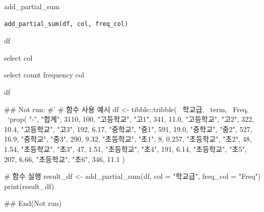 \documentclass[a4paper]{book}
\begin{document}
%
\begin{Description}
add\_partial\_sum
\end{Description}
%
\begin{Usage}
\begin{verbatim}
add_partial_sum(df, col, freq_col)
\end{verbatim}
\end{Usage}
%
\begin{Arguments}
\begin{ldescription}
\item[\code{df}] df

\item[\code{col}] select col

\item[\code{freq\_col}] select count frequency col
\end{ldescription}
\end{Arguments}
%
\begin{Value}
df
\end{Value}
%
\begin{Examples}
\begin{ExampleCode}
\#\# Not run: 
#'
# 함수 사용 예시
df <- tibble::tribble(
  ~학교급, ~term, ~Freq, ~`prop(%
  "-", "합계", 3110, 100,
  "고등학교", "고1", 341, 11.0,
  "고등학교", "고2", 322, 10.4,
  "고등학교", "고3", 192, 6.17,
  "중학교", "중1", 591, 19.0,
  "중학교", "중2", 527, 16.9,
  "중학교", "중3", 290, 9.32,
  "초등학교", "초1", 8, 0.257,
  "초등학교", "초2", 48, 1.54,
  "초등학교", "초3", 47, 1.51,
  "초등학교", "초4", 191, 6.14,
  "초등학교", "초5", 207, 6.66,
  "초등학교", "초6", 346, 11.1
)

# 함수 실행
result_df <- add_partial_sum(df, col = "학교급", freq_col = "Freq")
print(result_df)

## End(Not run)

\end{ExampleCode}
\end{Examples}
\end{document}
